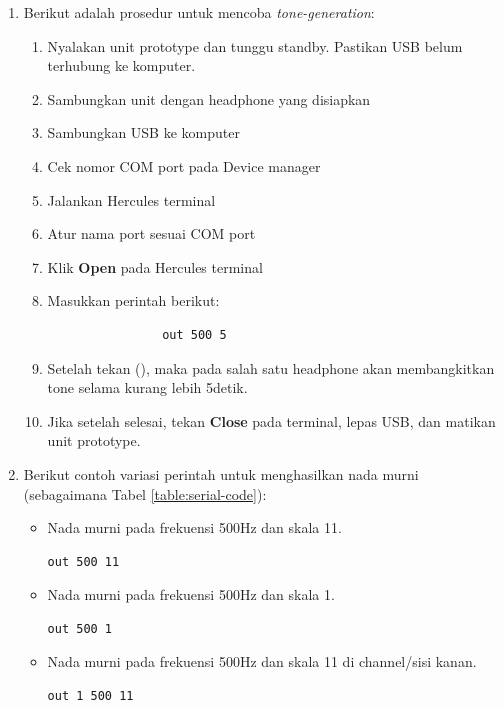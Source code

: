 \documentclass{article}
\begin{document}
\begin{enumerate}
		\item Berikut adalah prosedur untuk mencoba \textit{tone-generation}:
		\begin{enumerate}
			\item Nyalakan unit prototype dan tunggu standby.
			Pastikan USB belum terhubung ke komputer.
			\item Sambungkan unit dengan headphone yang disiapkan
			\item Sambungkan USB ke komputer
			\item Cek nomor COM port pada Device manager
			\item Jalankan Hercules terminal
			\item Atur nama port sesuai COM port
			\item Klik \textbf{Open} pada Hercules terminal
			\item Masukkan perintah berikut:
			\begin{verbatim}
				out 500 5
			\end{verbatim}
			\item Setelah tekan (\keys{\return}), maka pada salah satu headphone
			akan membangkitkan tone selama kurang lebih 5detik.
			\item Jika setelah selesai, tekan \textbf{Close} pada terminal,
			lepas USB, dan matikan unit prototype.

		\end{enumerate}

		\item Berikut contoh variasi perintah untuk menghasilkan nada murni (sebagaimana Tabel \ref{table:serial-code}):

		\begin{itemize}
			\item Nada murni pada frekuensi 500Hz dan skala 11.
			\begin{verbatim}
out 500 11
			\end{verbatim}

			\item Nada murni pada frekuensi 500Hz dan skala 1.
			\begin{verbatim}
out 500 1
			\end{verbatim}

			\item Nada murni pada frekuensi 500Hz dan skala 11 di channel/sisi kanan.
			\begin{verbatim}
out 1 500 11
			\end{verbatim}


\end{itemize}
\end{enumerate}
\end{document}
